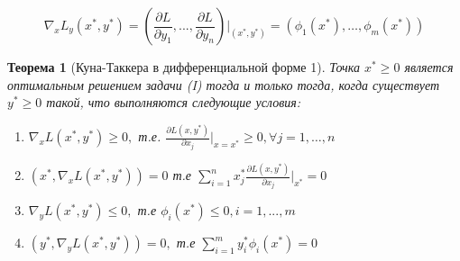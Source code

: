 \documentclass[a4paper]{article}
\newtheorem{theorem}{Теорема}[section]
\theoremstyle{definition}
\theoremstyle{remark}
\begin{document}
\[\nabla_x L_y(x^*, y^*) = (\frac{\partial L}{\partial y_1}, ..., \frac{\partial L}{\partial y_n})|_{(x^*, y^*)} = (\phi_1(x^*), \dots, \phi_m(x^*))\]
\begin{theorem}[Куна-Таккера в дифференциальной форме 1]
    Точка $x^* \ge 0$ является оптимальным решением задачи (I) тогда  и только тогда, когда существует $y^*\ge 0$ такой, что выполняются следующие условия:
    \begin{enumerate}
        \item $\nabla_x L(x^*, y^*) \ge 0,$ т.е. $\frac{\partial L(x, y^*)}{\partial x_j} |_{x = x^*} \ge 0, \forall j = 1, \dots, n$
        \item $(x^*, \nabla_x L(x^*, y^*)) = 0$ т.е $\sum_{i = 1}^n x^*_j\frac{\partial L(x, y^*)}{\partial x_j}|_{x^*} = 0$
        \item $\nabla_y L(x^*, y^*) \le 0,$ т.е $\phi_i(x^*)\le 0, i = 1, ..., m$
        \item $(y^*, \nabla_y L(x^*, y^*)) = 0, $ т.е $\sum_{i = 1}^{m}y^*_i \phi_i(x^*) = 0$
    \end{enumerate}
\end{theorem}
\end{document}
